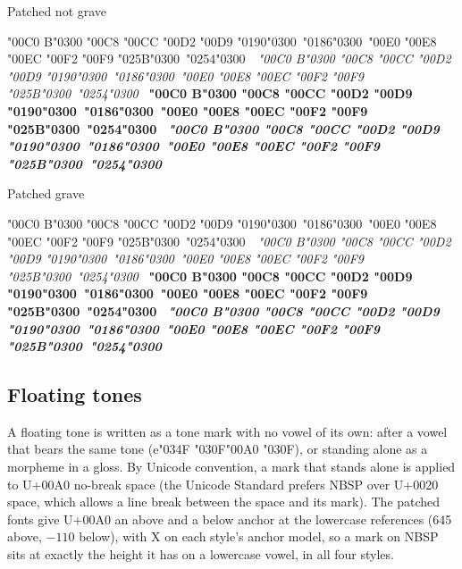 \documentclass[landscape]{article}
\newcommand{\PREC}[1]{{\color{supportedprec}#1}}
\newcommand{\ribbiline}[1]{#1\ 
	{\itshape #1}
	{\bfseries #1}
	{\itshape\bfseries #1}}
\newcommand{\cgj}{\char"034F }
\newcommand{\nbsp}{\char"00A0 }
\newcommand{\floattone}[2]{#1\cgj#2\nbsp#2}
\begin{document}
Patched not grave

{\LibertinusSerifPatch
\ribbiline{\PREC{\char"00C0} B\char"0300 \PREC{\char"00C8} \PREC{\char"00CC} \PREC{\char"00D2} \PREC{\char"00D9} \char"0190\char"0300\ \char"0186\char"0300\
\PREC{\char"00E0} \PREC{\char"00E8} \PREC{\char"00EC} \PREC{\char"00F2} \PREC{\char"00F9} \char"025B\char"0300\ \char"0254\char"0300\ }
}

Patched grave

{\LibertinusSerifPatchGrave
\ribbiline{\PREC{\char"00C0} B\char"0300 \PREC{\char"00C8} \PREC{\char"00CC} \PREC{\char"00D2} \PREC{\char"00D9} \char"0190\char"0300\ \char"0186\char"0300\
\PREC{\char"00E0} \PREC{\char"00E8} \PREC{\char"00EC} \PREC{\char"00F2} \PREC{\char"00F9} \char"025B\char"0300\ \char"0254\char"0300\ }
}


\subsection*{Floating tones}

A floating tone is written as a tone mark with no vowel of its own: after a vowel that bears the same tone ({\LibertinusSerifPatch\floattone{e}{\char"030F}}), or standing alone as a morpheme in a gloss.
By Unicode convention, a mark that stands alone is applied to U+00A0 no-break space (the Unicode Standard prefers NBSP over U+0020 space, which allows a line break between the space and its mark).
The patched fonts give U+00A0 an above and a below anchor at the lowercase references (645 above, $-110$ below), with X on each style's anchor model, so a mark on NBSP sits at exactly the height it has on a lowercase vowel, in all four styles.
\end{document}
